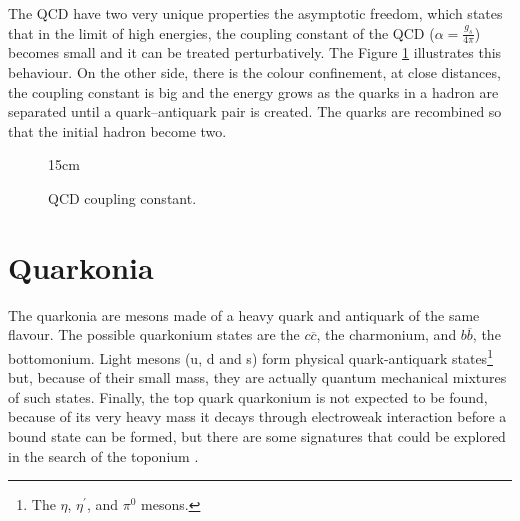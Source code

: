 The QCD have two very unique properties the asymptotic freedom, which states that in the limit of high energies, the coupling constant of the QCD ($\alpha = \frac{g_s}{4\pi}$) becomes small \cite{PhysRevLett.30.1343, PhysRevLett.30.1346} and it can be treated perturbatively. The Figure \ref{fig:couplingQCD} illustrates this behaviour. On the other side, there is the colour confinement, at close distances, the coupling constant is big and the energy grows as the quarks in a hadron are separated until a quark–antiquark pair is created. The quarks are recombined so that the initial hadron become two.

\begin{figure}[!htm]{15cm} %
\caption{QCD coupling constant.}%
\label{fig:couplingQCD}
\end{figure}

\section{Quarkonia}

The quarkonia are mesons made of a heavy quark and antiquark of the same flavour. The possible quarkonium states are the $c\overline{c}$, the charmonium, and $b\overline{b}$, the bottomonium. Light mesons (u, d and s) form physical quark-antiquark states\footnote{The $\eta$, $\eta^\prime$, and $\pi^0$ mesons.} but, because of their small mass, they are actually quantum mechanical mixtures of such states. Finally, the top quark quarkonium is not expected to be found, because of its very heavy mass it decays through electroweak interaction before a bound state can be formed, but there are some signatures that could be explored in the search of the toponium \cite{Fuks:2021xje}.

